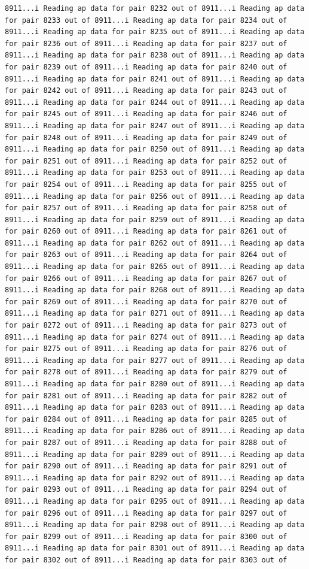 \documentclass[
]{article}
\begin{document}
\begin{verbatim}
8911...i Reading ap data for pair 8232 out of 8911...i Reading ap data for pair 8233 out of 8911...i Reading ap data for pair 8234 out of 8911...i Reading ap data for pair 8235 out of 8911...i Reading ap data for pair 8236 out of 8911...i Reading ap data for pair 8237 out of 8911...i Reading ap data for pair 8238 out of 8911...i Reading ap data for pair 8239 out of 8911...i Reading ap data for pair 8240 out of 8911...i Reading ap data for pair 8241 out of 8911...i Reading ap data for pair 8242 out of 8911...i Reading ap data for pair 8243 out of 8911...i Reading ap data for pair 8244 out of 8911...i Reading ap data for pair 8245 out of 8911...i Reading ap data for pair 8246 out of 8911...i Reading ap data for pair 8247 out of 8911...i Reading ap data for pair 8248 out of 8911...i Reading ap data for pair 8249 out of 8911...i Reading ap data for pair 8250 out of 8911...i Reading ap data for pair 8251 out of 8911...i Reading ap data for pair 8252 out of 8911...i Reading ap data for pair 8253 out of 8911...i Reading ap data for pair 8254 out of 8911...i Reading ap data for pair 8255 out of 8911...i Reading ap data for pair 8256 out of 8911...i Reading ap data for pair 8257 out of 8911...i Reading ap data for pair 8258 out of 8911...i Reading ap data for pair 8259 out of 8911...i Reading ap data for pair 8260 out of 8911...i Reading ap data for pair 8261 out of 8911...i Reading ap data for pair 8262 out of 8911...i Reading ap data for pair 8263 out of 8911...i Reading ap data for pair 8264 out of 8911...i Reading ap data for pair 8265 out of 8911...i Reading ap data for pair 8266 out of 8911...i Reading ap data for pair 8267 out of 8911...i Reading ap data for pair 8268 out of 8911...i Reading ap data for pair 8269 out of 8911...i Reading ap data for pair 8270 out of 8911...i Reading ap data for pair 8271 out of 8911...i Reading ap data for pair 8272 out of 8911...i Reading ap data for pair 8273 out of 8911...i Reading ap data for pair 8274 out of 8911...i Reading ap data for pair 8275 out of 8911...i Reading ap data for pair 8276 out of 8911...i Reading ap data for pair 8277 out of 8911...i Reading ap data for pair 8278 out of 8911...i Reading ap data for pair 8279 out of 8911...i Reading ap data for pair 8280 out of 8911...i Reading ap data for pair 8281 out of 8911...i Reading ap data for pair 8282 out of 8911...i Reading ap data for pair 8283 out of 8911...i Reading ap data for pair 8284 out of 8911...i Reading ap data for pair 8285 out of 8911...i Reading ap data for pair 8286 out of 8911...i Reading ap data for pair 8287 out of 8911...i Reading ap data for pair 8288 out of 8911...i Reading ap data for pair 8289 out of 8911...i Reading ap data for pair 8290 out of 8911...i Reading ap data for pair 8291 out of 8911...i Reading ap data for pair 8292 out of 8911...i Reading ap data for pair 8293 out of 8911...i Reading ap data for pair 8294 out of 8911...i Reading ap data for pair 8295 out of 8911...i Reading ap data for pair 8296 out of 8911...i Reading ap data for pair 8297 out of 8911...i Reading ap data for pair 8298 out of 8911...i Reading ap data for pair 8299 out of 8911...i Reading ap data for pair 8300 out of 8911...i Reading ap data for pair 8301 out of 8911...i Reading ap data for pair 8302 out of 8911...i Reading ap data for pair 8303 out of 
\end{verbatim}
\end{document}
